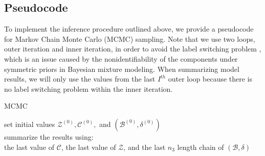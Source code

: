 \documentclass[a4paper]{article}
\begin{document}
 \subsection{Pseudocode}  \label{subsec: Pseudocode}
 To implement the inference procedure outlined above, we provide a pseudocode for Markov Chain Monte Carlo (MCMC) sampling. Note that we use two loops, outer iteration and inner iteration, in order to avoid the label switching problem \citep{jasra2005markov}, which is an issue caused by the nonidentifiability of the components under symmetric priors in Bayesian mixture modeling. When summarizing model results, we will only use the values from the last $I^{th}$ outer loop because there is no label switching problem within the inner iteration.
 \begin{algorithm}[H]
 	\SetAlgoLined
 	\caption{MCMC}
 	set initial values $\mathcal{Z}^{(0)}, \mathcal{C}^{(0)}, $ and $(\mathcal{B}^{(0)}, \delta^{(0)})$\\
 		summarize the results using:\\ the last value of $\mathcal{C}$, the last value of $\mathcal{Z}$, and the last $n_3$ length chain of $(\mathcal{B}, \delta)$
 \end{algorithm}
\end{document}

